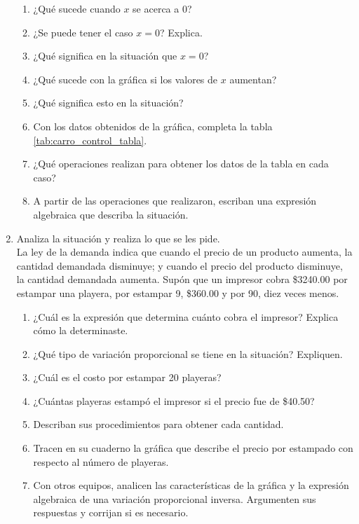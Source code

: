 \documentclass[11pt]{book}
\begin{document}
\begin{enumerate}
\begin{minipage}[t]{0.5\linewidth}
\begin{enumerate}
            \item ¿Qué sucede cuando $x$ se acerca a 0?
            \item ¿Se puede tener el caso $x = 0$? Explica.
            \item ¿Qué significa en la situación que $x=0$?
            \item ¿Qué sucede con la gráfica si los valores de $x$ aumentan?
            \item ¿Qué significa esto en la situación?
            \item Con los datos obtenidos de la gráfica, completa la tabla \ref{tab:carro_control_tabla}.
            \item ¿Qué operaciones realizan para obtener los datos de la tabla en cada caso?
            \item A partir de las operaciones que realizaron, escriban una expresión algebraica que describa la situación.
          \end{enumerate}
        \end{minipage}

  \item Analiza la situación y realiza lo que se les pide.\\

        La ley de la demanda indica que cuando el precio de un producto aumenta, la cantidad demandada disminuye;
        y cuando el precio del producto disminuye, la cantidad demandada aumenta. Supón que un impresor cobra \$3240.00
        por estampar una playera, por estampar 9, \$360.00 y por 90, diez veces menos.
        \begin{enumerate}
          \item ¿Cuál es la expresión que determina cuánto cobra el impresor? Explica cómo la determinaste.
          \item ¿Qué tipo de variación proporcional se tiene en la situación? Expliquen.
          \item ¿Cuál es el costo por estampar 20 playeras?
          \item ¿Cuántas playeras estampó el impresor si el precio fue de \$40.50?
          \item Describan sus procedimientos para obtener cada cantidad.
          \item Tracen en su cuaderno la gráfica que describe el precio por estampado con respecto al número de playeras.
          \item Con otros equipos, analicen las características de la gráfica y la expresión algebraica de una variación proporcional inversa. Argumenten sus respuestas y corrijan si es necesario.
        \end{enumerate}


\end{enumerate}
\end{document}

